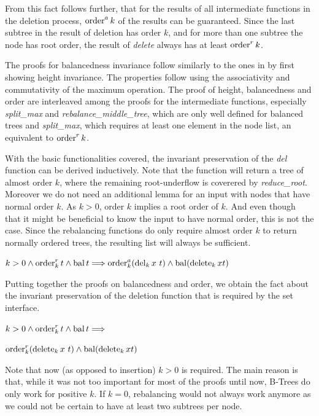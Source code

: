 From this fact follows further, that for the results of all intermediate functions
in the deletion process, $\operatorname{order}^a k$ of the results can be guaranteed.
Since the last subtree in the result of deletion has order $k$,
and for more than one subtree the node has root order,
the result of \textit{delete} always has at least $\operatorname{order}^r k$.

The proofs for balancedness invariance follow similarly to
the ones in  by first showing height invariance.
The properties follow using the associativity
and commutativity of the maximum operation.
The proof of height, balancedness and order
are interleaved among the proofs for the
intermediate functions, especially
\textit{split\_max} and \textit{rebalance\_middle\_tree},
which are only well defined for balanced trees
and \textit{split\_max}, which requires at least
one element in the node list, an equivalent
to $\operatorname{order}^r k$.

With the basic functionalities covered,
the invariant preservation of the \textit{del} function
can be derived inductively.
Note that the function will return a tree of almost order $k$,
where the remaining root-underflow is coverered by \textit{reduce\_root}.
Moreover we do not need an additional lemma
for an input with nodes that have normal order $k$.
As $k > 0$, order $k$ implies a root order of $k$.
And even though that it might be beneficial to know
the input to have normal order, this is not the case.
Since the rebalancing functions do only require
almost order $k$ to return normally ordered trees,
the resulting list will always be sufficient.

\begin{lemma}
    $k > 0 \wedge \operatorname{order}^r_k t \wedge \operatorname{bal} t \Longrightarrow
    \operatorname{order}^a_k (\operatorname{del}_k x\ t) \wedge \operatorname{bal} (\operatorname{delete}_k x t)$
\end{lemma}

Putting together the proofs on balancedness and
order, we obtain the fact about the invariant
preservation of the deletion function that is required by the set interface.

\begin{theorem}
    $k > 0 \wedge \operatorname{order}^r_k t \wedge \operatorname{bal} t \Longrightarrow$ \\
    \begin{center}
    $\operatorname{order}^r_k (\operatorname{delete}_k x\ t) \wedge \operatorname{bal} (\operatorname{delete}_k x t)$
    \end{center}
\end{theorem}

Note that now (as opposed to insertion) $k > 0$ is required.
The main reason is that, while it was not too important for most of the proofs until now,
B-Trees do only work for positive $k$.
If $k = 0$, rebalancing would not always work anymore
as we could not be certain to have at least two subtrees per node.

